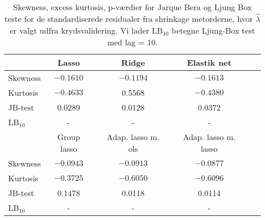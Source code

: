\begin{table}
\center
\begin{tabular}{lrrrrrrrrrr} 
\toprule
& \multicolumn{2}{c}{Lasso} && \multicolumn{2}{c}{Ridge } && \multicolumn{2}{c}{Elastik net} \\ \midrule
Skewness & \multicolumn{2}{c}{$-0.1610$} &&\multicolumn{2}{c}{$-0.1194$} && \multicolumn{2}{c}{$- 0.1613$} \\
Kurtosis & \multicolumn{2}{c}{$ -0.4633 $} && \multicolumn{2}{c}{0.5568} &&\multicolumn{2}{c}{$-0.4380$} \\
JB-test & \multicolumn{2}{c}{0.0289} && \multicolumn{2}{c}{0.0128} && \multicolumn{2}{c}{0.0372}  \\
LB$_{10}$ &  \multicolumn{2}{c}{-} &&  \multicolumn{2}{c}{-} &&  \multicolumn{2}{c}{-} \\  \bottomrule \toprule
 & \multicolumn{2}{c}{Group lasso} && \multicolumn{2}{c}{Adap. lasso m. ols}  && \multicolumn{2}{c}{Adap. lasso m. lasso} \\ \midrule
Skewness & \multicolumn{2}{c}{$-0.0943$} &&  \multicolumn{2}{c}{$-0.0913$} && \multicolumn{2}{c}{$-0.0877$} \\
Kurtosis & \multicolumn{2}{c}{$-0.3725$} &&   \multicolumn{2}{c}{$-0.6050 $} && \multicolumn{2}{c}{$-0.6096$} \\
JB-test & \multicolumn{2}{c}{0.1478}  &&  \multicolumn{2}{c}{0.0118} &&  \multicolumn{2}{c}{0.0114} \\ 
LB$_{10}$ &  \multicolumn{2}{c}{-} &&  \multicolumn{2}{c}{-} &&  \multicolumn{2}{c}{-} \\ \bottomrule
 \end{tabular}
\caption{Skewness, excess kurtosis, p-værdier for Jarque Bera og Ljung Box teste for de standardiserede residualer fra shrinkage metorderne, hvor $\widehat{\lambda}$ er valgt udfra krydsvalidering. Vi lader LB$_{10}$ betegne Ljung-Box test med lag = 10. } \label{tab:res_shrinkage_tab}
\end{table}